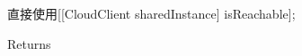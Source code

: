 
\begin{DoxyRefList}
\item[\label{deprecated__deprecated000001}%
\hypertarget{deprecated__deprecated000001}{}%
Member \hyperlink{interface_util_a344afa0140847ec221b1dbbcb04687f3}{\mbox{[}Util is\+Network\+Available\mbox{]}} ]直接使用\mbox{[}\mbox{[}Cloud\+Client shared\+Instance\mbox{]} is\+Reachable\mbox{]}; \begin{DoxyReturn}{Returns}

\end{DoxyReturn}

\end{DoxyRefList}